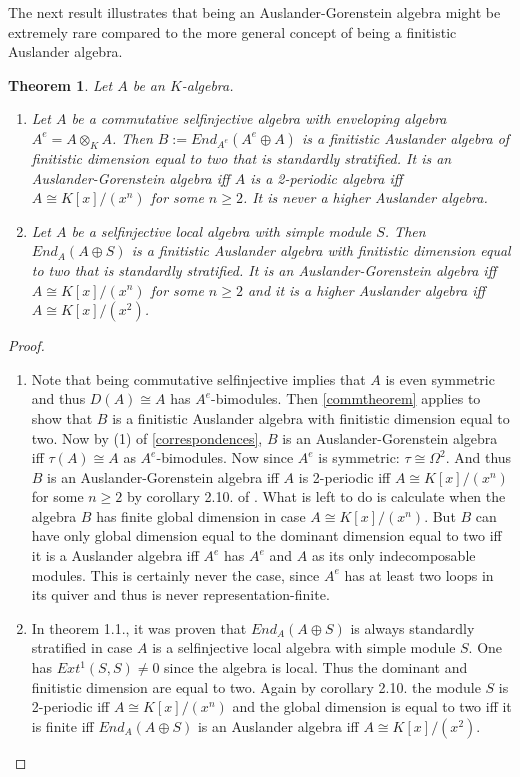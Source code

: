 \documentclass[a4paper]{amsart}
\newtheorem{theorem}{Theorem}[section]
\theoremstyle{definition}
\theoremstyle{remark}
\numberwithin{equation}{theorem}
\begin{document}
The next result illustrates that being an Auslander-Gorenstein algebra might be extremely rare compared to the more general concept of being a finitistic Auslander algebra.    
\begin{theorem} \label{theoremexamples}
Let $A$ be an $K$-algebra.
\begin{enumerate}
\item Let $A$ be a commutative selfinjective algebra with enveloping algebra $A^{e}=A \otimes_K A$. Then $B:=End_{A^{e}}(A^{e} \oplus A)$ is a finitistic Auslander algebra of finitistic dimension equal to two that is standardly stratified.
It is an Auslander-Gorenstein algebra iff $A$ is a 2-periodic algebra iff $A \cong K[x]/(x^n)$ for some $n \geq 2$.
It is never a higher Auslander algebra.
\item Let $A$ be a selfinjective local algebra with simple module $S$. Then $End_A(A \oplus S)$ is a finitistic Auslander algebra with finitistic dimension equal to two that is standardly stratified. It is an Auslander-Gorenstein algebra iff $A \cong K[x]/(x^n)$ for some $n \geq 2$ and it is a higher Auslander algebra iff $A \cong K[x]/(x^2)$.

\end{enumerate}
\end{theorem}
\begin{proof}
\begin{enumerate}
\item Note that being commutative selfinjective implies that $A$ is even symmetric and thus $D(A) \cong A$ has $A^{e}$-bimodules. Then \ref{commtheorem} applies to show that $B$ is a finitistic Auslander algebra with finitistic dimension equal to two. Now by (1) of \ref{correspondences}, $B$ is an Auslander-Gorenstein algebra iff $\tau(A) \cong A$ as $A^{e}$-bimodules. Now since $A^{e}$ is symmetric: $\tau \cong \Omega^{2}$. And thus $B$ is an Auslander-Gorenstein algebra iff $A$ is 2-periodic iff $A \cong K[x]/(x^n)$ for some $n \geq 2$ by corollary 2.10. of \cite{Sko}. What is left to do is calculate when the algebra $B$ has finite global dimension in case $A \cong K[x]/(x^n)$.
But $B$ can have only global dimension equal to the dominant dimension equal to two iff it is a Auslander algebra iff $A^{e}$ has $A^{e}$ and $A$ as its only indecomposable modules. This is certainly never the case, since $A^{e}$ has at least two loops in its quiver and thus is never representation-finite.
\item In \cite{We} theorem 1.1., it was proven that $End_A(A \oplus S)$ is always standardly stratified in case $A$ is a selfinjective local algebra with simple module $S$. One has $Ext^{1}(S,S) \neq 0$ since the algebra is local. Thus the dominant and finitistic dimension are equal to two. Again by \cite{Sko} corollary 2.10. the module $S$ is 2-periodic iff $A \cong K[x]/(x^n)$ and the global dimension is equal to two iff it is finite iff $End_A(A \oplus S)$ is an Auslander algebra iff $A \cong K[x]/(x^2)$.
\end{enumerate}
\end{proof}
\end{document}
